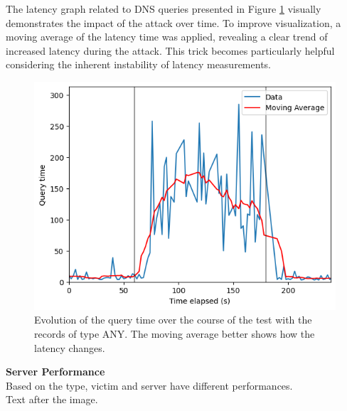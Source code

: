 The latency graph related to DNS queries presented in Figure \ref{fig:Query_MA_ANY1} visually demonstrates the impact of the attack over time. To improve visualization, a moving average of the latency time was applied, revealing a clear trend of increased latency during the attack. This trick becomes particularly helpful considering the inherent instability of latency measurements.
\begin{figure}[H]
    \centering
    \includegraphics[width=\columnwidth]{Sections/Images/Query_MA_ANY.png}
    \caption{Evolution of the query time over the course of the test with the records of type ANY. The moving average better shows how the latency changes.}
    \label{fig:Query_MA_ANY1}
\end{figure}

\noindent \textbf{Server Performance}\\
Based on the type, victim and server have different performances.\\
\noindent Text after the image.\\
